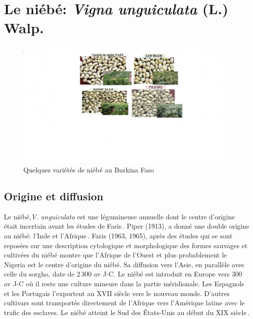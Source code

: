 \documentclass[a4paper,11pt]{article}
\begin{document}
\section{Le niébé: \emph{Vigna unguiculata} (L.) Walp.}
\begin{figure}%
  \begin{center}
   \includegraphics[width=12cm]{images/graines_niebe}
  \end{center}
\caption{Quelques variétés de niébé au Burkina Faso}
\end{figure}

\newpage



\subsection{Origine et diffusion}

Le niébé,\emph{V. unguiculata} est une légumineuse annuelle dont le
centre d’origine était incertain avant les études de
Faris\,\cite{FARIS_1963,FARIS_1965}. Piper (1913), a donné une double
origine au niébé: l’Inde et l’Afrique\,\cite{Piper_1913}. Faris (1963,
1965), après des études qui se sont reposées sur une description
cytologique et morphologique des formes sauvages et cultivées du niébé
montre que l’Afrique de l’Ouest et plus probablement le Nigeria est le
centre d’origine du niébé. Sa diffusion vers l’Asie, en parallèle avec
celle du sorgho, date de 2\,300 av J-C. Le niébé est introduit en
Europe vers 300 av J-C où il reste une culture mineure dans la partie
méridionale. Les Espagnols et les Portugais l’exportent au XVII\ieme{}
siècle vers le nouveau monde. D’autres cultivars sont transportés
directement de l’Afrique vers l’Amérique latine avec le trafic des
esclaves. Le niébé atteint le Sud des États-Unis au début du
XIX\ieme{} siècle\,\cite{Sawadogo_2009}.
\end{document}
